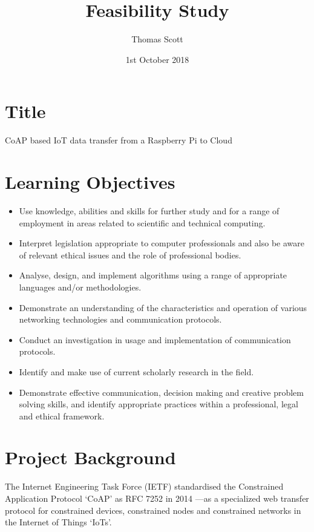 \documentclass{article}
\title{Feasibility Study}
\author{Thomas Scott}
\date{1st October 2018}
\begin{document}
	\maketitle
	\newpage

	\section{Title}

	CoAP based IoT data transfer from a Raspberry Pi to Cloud 

	\section{Learning Objectives}
	
	\begin{itemize}	
	\item Use knowledge, abilities and skills for further study and for a range of employment in areas related to scientific and technical computing.
	\item Interpret legislation appropriate to computer professionals and also be aware of relevant ethical issues and the role of professional bodies.
	\item Analyse, design, and implement algorithms using a range of appropriate languages and/or methodologies.
	\item Demonstrate an understanding of the characteristics and operation of various networking technologies and communication protocols.
	\item Conduct an investigation in usage and implementation of communication protocols.
	\item Identify and make use of current scholarly research in the field.
	\item Demonstrate effective communication, decision making and creative problem solving skills, and identify appropriate practices within a professional, legal and ethical framework.
	\end{itemize}

	\section{Project Background}

	The Internet Engineering Task Force (IETF) standardised the Constrained Application Protocol `CoAP' as RFC 7252 in 2014 —as a specialized web transfer protocol for constrained devices, constrained nodes and constrained networks in the Internet of Things ‘IoTs’. \citep{bormann2015constrained}
	
\end{document}
